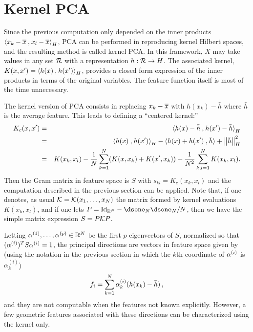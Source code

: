 \section{Kernel PCA}
Since the previous computation only depended on the inner products
${\langle {x_k-\overline{x}}\mathbin{,} {x_l-\overline{x}}\rangle}_H$, PCA can be performed in reproducing kernel Hilbert spaces, and the resulting method is called
kernel PCA. In this framework, $X$ may take values in any set ${\mathcal R}$ with a representation $h: {\mathcal R} \to H$. The associated  kernel, $K(x,x')
={\langle {h(x)}\mathbin{,} {h(x')}\rangle}_H$,  provides a closed form expression of  the inner products in terms of the original variables. The
feature function itself is most of the time unnecessary.

The kernel version of PCA consists in replacing $x_k - \overline{x}$ with $h(x_k) - \bar h$ where $\bar h$ is the average feature. This leads to defining 
a ``centered kernel:''
\begin{eqnarray*}
K_c(x,x') &=&{\langle {h(x) - \bar h}\mathbin{,} {h(x')-\bar h}\rangle}_H\\
&=&{\langle {h(x)}\mathbin{,} {h(x')}\rangle}_H - {\langle {h(x)+h(x')}\mathbin{,} {\bar h}\rangle} + \left\| \bar h \right\|_H^2\\
&=& K(x_k, x_l) -\frac{1}{N} \sum_{k=1}^N (K(x,x_k)+K(x',x_k)) +  \frac{1}{N^2}\sum_{k,l=1}^N K(x_k, x_l).
\end{eqnarray*}
Then the Gram matrix in feature space is  $S$ with $s_{kl} = K_c(x_k, x_l)$ and the computation described in the previous section can be applied. Note that, if one denotes, as usual ${\mathcal K} = {\mathcal K}(x_1, \ldots, x_N)$ the matrix formed by kernel evaluations $K(x_k, x_l)$, and if one lets $P = \Id[N] - \dsone_N\dsone_N/N$, then we have the simple matrix expression $S = P{\mathcal K} P$.

\bigskip

Letting $\alpha^{(1)}, \ldots, \alpha^{(p)} \in {\mathbb{R}}^N$ be the first $p$ eigenvectors of $S$, normalized so that $(\alpha^{(i)})^TS\alpha^{(i)} = 1$,
the principal
directions are vectors in feature space given by (using the notation in the previous section in which the $k$th coordinate of $\alpha^{(i)}$ is $\alpha_k^{(i)}$)
$$
f_i = \sum_{k=1}^N \alpha_{k}^{(i)} (h(x_k) - \bar h)\,,
$$
and they are not computable when the features not known explicitly. However, a few geometric features associated with these directions can be characterized using the kernel only.

